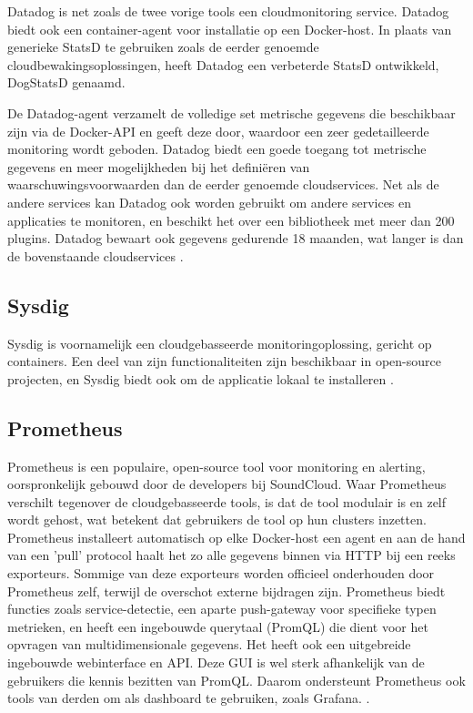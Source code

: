 Datadog is net zoals de twee vorige tools een cloudmonitoring service.  Datadog biedt ook een container-agent voor installatie op een Docker-host. In plaats van generieke StatsD te gebruiken zoals de eerder genoemde cloudbewakingsoplossingen, heeft Datadog een verbeterde StatsD ontwikkeld, DogStatsD genaamd.

De Datadog-agent verzamelt de volledige set metrische gegevens die beschikbaar zijn via de Docker-API en geeft deze door, waardoor een zeer gedetailleerde monitoring wordt geboden. Datadog biedt een goede toegang tot metrische gegevens en meer mogelijkheden bij het definiëren van waarschuwingsvoorwaarden dan de eerder genoemde cloudservices. Net als de andere services kan Datadog ook worden gebruikt om andere services en applicaties te monitoren, en beschikt het over een bibliotheek met meer dan 200 plugins. Datadog bewaart ook gegevens gedurende 18 maanden, wat langer is dan de bovenstaande cloudservices \autocite{Sissons2021}.

\subsection{Sysdig}

Sysdig is voornamelijk een cloudgebasseerde monitoringoplossing, gericht op containers. Een deel van zijn functionaliteiten zijn beschikbaar in open-source projecten, en Sysdig biedt ook om de applicatie lokaal te installeren \autocite{Sissons2021}.

\subsection{Prometheus}

Prometheus is een populaire, open-source tool voor monitoring en alerting, oorspronkelijk gebouwd door de developers bij SoundCloud. Waar Prometheus verschilt tegenover de cloudgebasseerde tools, is dat de tool modulair is en zelf wordt gehost, wat betekent dat gebruikers de tool op hun clusters inzetten. Prometheus installeert automatisch op elke Docker-host een agent en aan de hand van een 'pull' protocol haalt het zo alle gegevens binnen via HTTP bij een reeks exporteurs. Sommige van deze exporteurs worden officieel onderhouden door Prometheus zelf, terwijl de overschot externe bijdragen zijn. Prometheus biedt functies zoals service-detectie, een aparte push-gateway voor specifieke typen metrieken, en heeft een ingebouwde querytaal (PromQL) die dient voor het opvragen van multidimensionale gegevens. Het heeft ook een uitgebreide ingebouwde webinterface en API. Deze GUI is wel sterk afhankelijk van de gebruikers die kennis bezitten van PromQL. Daarom ondersteunt Prometheus ook tools van derden om als dashboard te gebruiken, zoals Grafana. \autocite{Sissons2021}.  

